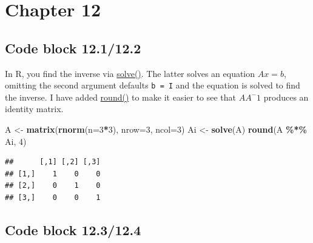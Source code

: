 \documentclass[
]{book}
\newenvironment{Shaded}{\begin{snugshade}}{\end{snugshade}}
\newcommand{\DataTypeTok}[1]{\textcolor[rgb]{0.13,0.29,0.53}{#1}}
\newcommand{\DecValTok}[1]{\textcolor[rgb]{0.00,0.00,0.81}{#1}}
\newcommand{\KeywordTok}[1]{\textcolor[rgb]{0.13,0.29,0.53}{\textbf{#1}}}
\newcommand{\NormalTok}[1]{#1}
\newcommand{\OperatorTok}[1]{\textcolor[rgb]{0.81,0.36,0.00}{\textbf{#1}}}
\newcommand{\StringTok}[1]{\textcolor[rgb]{0.31,0.60,0.02}{#1}}
\begin{document}
\hypertarget{chapter-12}{%
\section*{Chapter 12}\label{chapter-12}}

\hypertarget{code-block-12.112.2}{%
\subsection*{Code block 12.1/12.2}\label{code-block-12.112.2}}

In R, you find the inverse via \href{https://stat.ethz.ch/R-manual/R-devel/library/base/html/solve.html}{solve()}. The latter solves an equation \(Ax = b\), omitting the second argument defaults \texttt{b\ =\ I} and the equation is solved to find the inverse. I have added \href{https://stat.ethz.ch/R-manual/R-devel/library/base/html/Round.html}{round()} to make it easier to see that \(A A^-1\) produces an identity matrix.

\begin{Shaded}
\begin{Highlighting}[]
\NormalTok{A \textless{}{-}}\StringTok{ }\KeywordTok{matrix}\NormalTok{(}\KeywordTok{rnorm}\NormalTok{(}\DataTypeTok{n=}\DecValTok{3}\OperatorTok{*}\DecValTok{3}\NormalTok{), }\DataTypeTok{nrow=}\DecValTok{3}\NormalTok{, }\DataTypeTok{ncol=}\DecValTok{3}\NormalTok{)}
\NormalTok{Ai \textless{}{-}}\StringTok{ }\KeywordTok{solve}\NormalTok{(A)}
\KeywordTok{round}\NormalTok{(A }\OperatorTok{\%*\%}\StringTok{ }\NormalTok{Ai, }\DecValTok{4}\NormalTok{)}
\end{Highlighting}
\end{Shaded}

\begin{verbatim}
##      [,1] [,2] [,3]
## [1,]    1    0    0
## [2,]    0    1    0
## [3,]    0    0    1
\end{verbatim}

\hypertarget{code-block-12.312.4}{%
\subsection*{Code block 12.3/12.4}\label{code-block-12.312.4}}
\end{document}
